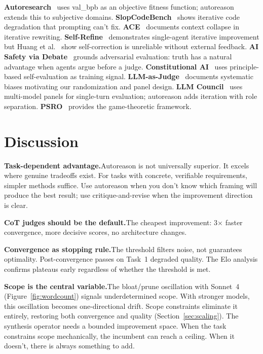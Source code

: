\documentclass[10pt,twocolumn]{article}
\begin{document}
\textbf{Autoresearch}~\cite{autoresearch} uses val\_bpb as an objective fitness function; autoreason extends this to subjective domains. \textbf{SlopCodeBench}~\cite{slopcodebench} shows iterative code degradation that prompting can't fix. \textbf{ACE}~\cite{ace} documents context collapse in iterative rewriting. \textbf{Self-Refine}~\cite{selfrefine} demonstrates single-agent iterative improvement but Huang et al.~\cite{huang2023} show self-correction is unreliable without external feedback. \textbf{AI Safety via Debate}~\cite{irving2018} grounds adversarial evaluation: truth has a natural advantage when agents argue before a judge. \textbf{Constitutional AI}~\cite{bai2022} uses principle-based self-evaluation as training signal. \textbf{LLM-as-Judge}~\cite{zheng2023} documents systematic biases motivating our randomization and panel design. \textbf{LLM Council}~\cite{llmcouncil} uses multi-model panels for single-turn evaluation; autoreason adds iteration with role separation. \textbf{PSRO}~\cite{psro} provides the game-theoretic framework.

\section{Discussion}

\textbf{Task-dependent advantage.}\enspace Autoreason is not universally superior. It excels where genuine tradeoffs exist. For tasks with concrete, verifiable requirements, simpler methods suffice. Use autoreason when you don't know which framing will produce the best result; use critique-and-revise when the improvement direction is clear.

\textbf{CoT judges should be the default.}\enspace The cheapest improvement: 3$\times$ faster convergence, more decisive scores, no architecture changes.

\textbf{Convergence as stopping rule.}\enspace The threshold filters noise, not guarantees optimality. Post-convergence passes on Task~1 degraded quality. The Elo analysis confirms plateaus early regardless of whether the threshold is met.

\textbf{Scope is the central variable.}\enspace The bloat/prune oscillation with Sonnet~4 (Figure~\ref{fig:wordcount}) signals underdetermined scope. With stronger models, this oscillation becomes one-directional drift. Scope constraints eliminate it entirely, restoring both convergence and quality (Section~\ref{sec:scaling}). The synthesis operator needs a bounded improvement space. When the task constrains scope mechanically, the incumbent can reach a ceiling. When it doesn't, there is always something to add.
\end{document}

